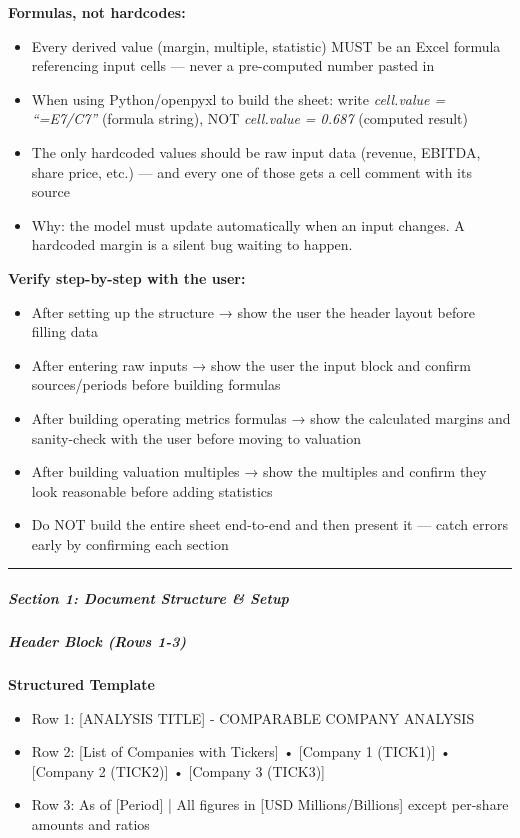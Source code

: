 \documentclass[11pt]{article}
\begin{document}
\textbf{Formulas, not hardcodes:}

\begin{itemize}[leftmargin=*,itemsep=2pt,topsep=2pt]
\item {} Every derived value (margin, multiple, statistic) MUST be an Excel formula referencing input cells — never a pre-computed number pasted in
\item {} When using Python/openpyxl to build the sheet: write \emph{cell.value = ``=E7/C7''} (formula string), NOT \emph{cell.value = 0.687} (computed result)
\item {} The only hardcoded values should be raw input data (revenue, EBITDA, share price, etc.) — and every one of those gets a cell comment with its source
\item {} Why: the model must update automatically when an input changes. A hardcoded margin is a silent bug waiting to happen.
\end{itemize}

\textbf{Verify step-by-step with the user:}

\begin{itemize}[leftmargin=*,itemsep=2pt,topsep=2pt]
\item {} After setting up the structure → show the user the header layout before filling data
\item {} After entering raw inputs → show the user the input block and confirm sources/periods before building formulas
\item {} After building operating metrics formulas → show the calculated margins and sanity-check with the user before moving to valuation
\item {} After building valuation multiples → show the multiples and confirm they look reasonable before adding statistics
\item {} Do NOT build the entire sheet end-to-end and then present it — catch errors early by confirming each section
\end{itemize}

\vspace{0.5em}\hrule\vspace{0.5em}

\subparagraph{Section 1: Document Structure \& Setup}\mbox{}\par

\subparagraph{Header Block (Rows 1-3)}\mbox{}\par
\textbf{Structured Template}
\begin{itemize}[leftmargin=*,itemsep=2pt,topsep=2pt]
\item {} Row 1: [ANALYSIS TITLE] - COMPARABLE COMPANY ANALYSIS
\item {} Row 2: [List of Companies with Tickers] • [Company 1 (TICK1)] • [Company 2 (TICK2)] • [Company 3 (TICK3)]
\item {} Row 3: As of [Period] | All figures in [USD Millions/Billions] except per-share amounts and ratios
\end{itemize}
\end{document}
